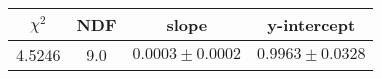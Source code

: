 \begin{tabular}{|c|c|c|c|}

\hline
$\chi^{2}$ & NDF & slope & y-intercept  \\
\hline
4.5246 & 9.0 & $0.0003\pm0.0002$ & $0.9963\pm0.0328$ \\
\hline

\end{tabular}